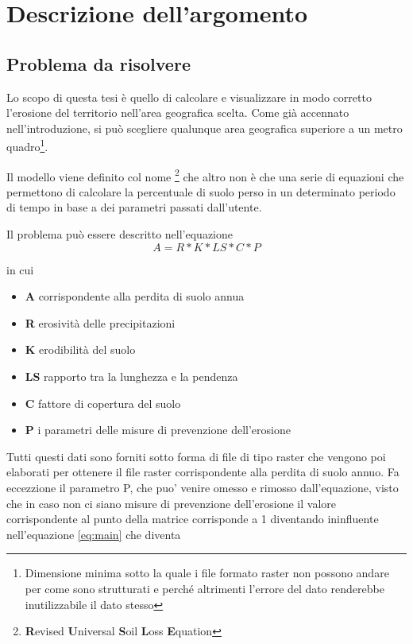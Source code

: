 
\chapter{Descrizione dell'argomento}
\label{cap:descrizione}
\section{Problema da risolvere}
\label{problemadarisolvere}
Lo scopo di questa tesi è quello di calcolare e visualizzare in modo corretto l'erosione del territorio nell'area geografica scelta. Come già accennato nell'introduzione, si può scegliere qualunque area geografica superiore a un metro quadro\footnote{Dimensione minima sotto la quale i file formato raster non possono andare per come sono strutturati e perché altrimenti l'errore del dato renderebbe inutilizzabile il dato stesso}.

Il modello viene definito col nome \rusle \footnote{\textbf{R}evised \textbf{U}niversal \textbf{S}oil \textbf{L}oss \textbf{E}quation} che altro non è che una serie di equazioni che permettono di calcolare la percentuale di suolo perso in un determinato periodo di tempo in base a dei parametri passati dall'utente.

Il problema può essere descritto nell'equazione
\begin{equation} \label{eq:main}
A = R * K * LS * C * P
\end{equation}

in cui
\begin{itemize} 
	\item \textbf{A} corrispondente alla perdita di suolo annua
	\item \textbf{R} erosività delle precipitazioni
	\item \textbf{K} erodibilità del suolo
	\item \textbf{LS} rapporto tra la lunghezza e la pendenza
	\item \textbf{C} fattore di copertura del suolo
	\item \textbf{P} i parametri delle misure di prevenzione dell'erosione
\end{itemize}

Tutti questi dati sono forniti sotto forma di file di tipo raster che vengono poi elaborati per ottenere il file raster corrispondente alla perdita di suolo annuo. Fa eccezzione il parametro P, che puo' venire omesso e rimosso dall'equazione, visto che in caso non ci siano misure di prevenzione dell'erosione il valore corrispondente al punto della matrice corrisponde a 1 diventando ininfluente nell'equazione \ref{eq:main} che diventa

